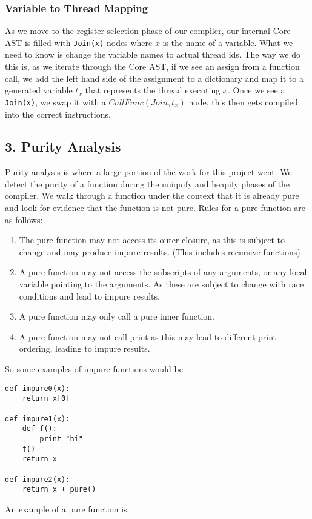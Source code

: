 \documentclass{acm_proc_article-sp}
\begin{document}
\subsubsection*{Variable to Thread Mapping}

As we move to the register selection phase of our compiler, our internal
Core AST is filled with \verb|Join(x)| nodes where $x$ is the name of a variable.
What we need to know is change the variable names to actual thread ids. The way
we do this is, as we iterate through the Core AST, if we see an assign from a
function call, we add the left hand side of the assignment to a dictionary and
map it to a generated variable $t_x$ that represents the thread executing $x$. Once
we see a \verb|Join(x)|, we swap it with a $CallFunc(Join, t_x)$ node, this then
gets compiled into the correct instructions.


\subsection*{3. Purity Analysis}

Purity analysis is where a large portion of the work for this project went. We detect
the purity of a function during the uniquify and heapify phases of the compiler. We walk
through a function under the context that it is already pure and look for evidence that
the function is not pure. Rules for a pure function are as follows:

\begin{enumerate}
\item The pure function may not access its outer closure, as this is subject to change and
may produce impure results. (This includes recursive functions)
\item A pure function may not access the subscripts of any arguments, or any local variable pointing
to the arguments. As these are subject to change with race conditions and lead to impure results.
\item A pure function may only call a pure inner function.
\item A pure function may not call print as this may lead to different print ordering, leading
to impure results.
\end{enumerate}

So some examples of impure functions would be 

\begin{verbatim}
def impure0(x):
    return x[0]

def impure1(x):
    def f():
        print "hi"
    f()
    return x

def impure2(x):
    return x + pure()
\end{verbatim}

An example of a pure function is:

\begin{verbatim}
\end{verbatim}
\end{document}
